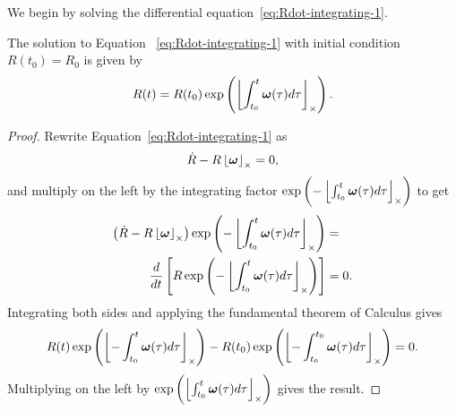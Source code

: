 We begin by solving the differential equation~\eqref{eq:Rdot-integrating-1}.
\begin{lemma} \label{eq:rotation_kinematics_solution}
The solution to Equation	~\eqref{eq:Rdot-integrating-1} with initial condition $R(t_0) = R_0$ is given by
\begin{equation}\label{eq:rotation_kinematics_solution}
R(t) = R(t_0)\exp\left(\ss{\int_{t_0}^t \omegabf(\tau) d\tau }\right).
\end{equation}
\end{lemma}
\begin{proof}
Rewrite Equation~\eqref{eq:Rdot-integrating-1} as
\[
\dot{R} - R\left\lfloor\boldsymbol{\omega}\right\rfloor_{\times} = 0,
\]
and multiply on the left by the integrating factor $\exp\left(-\left\lfloor\int_{t_0}^t\boldsymbol{\omega}(\tau)d\tau\right\rfloor_{\times}\right)$ to get
\begin{align*}
\left(\dot{R} - R\left\lfloor\boldsymbol{\omega}\right\rfloor_{\times}\right)\exp\left(-\left\lfloor\int_{t_0}^t \boldsymbol{\omega}(\tau)d\tau\right\rfloor_{\times}\right) &=\\
\frac{d}{dt}\left[R\exp\left(-\left\lfloor\int_{t_0}^t \boldsymbol{\omega}(\tau)d\tau\right\rfloor_{\times}\right)\right] &= 0.
\end{align*}
Integrating both sides and applying the fundamental theorem of Calculus gives 
\begin{equation}\label{eq:rotation_kinematics_solution}
R(t)\exp\left(\ss{-\int_{t_0}^t \omegabf(\tau) d\tau} \right) - R(t_0)\exp\left(\ss{-\int_{t_0}^{t_0} \omegabf(\tau) d\tau} \right) = 0.
\end{equation}
Multiplying on the left by $\exp\left(\left\lfloor\int_{t_0}^t \boldsymbol{\omega}(\tau) d\tau \right\rfloor_{\times}\right)$ gives the result.
\end{proof}

